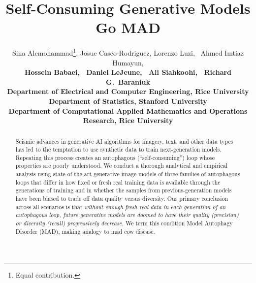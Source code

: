 \documentclass{article}
\title{Self-Consuming Generative Models Go MAD}
\author{
{\small
Sina Alemohammad\thanks{Equal contribution.},\footnotemark[2]{~~}  Josue Casco-Rodriguez\footnotemark[1],\footnotemark[2]{~~}
 Lorenzo Luzi\footnotemark[2],~ Ahmed Imtiaz Humayun\footnotemark[2],} \\
\small \bfseries
Hossein Babaei\footnotemark[2],~ 
Daniel LeJeune\footnotemark[3],~
Ali Siahkoohi\footnotemark[4],~ Richard G.\ Baraniuk\footnotemark[2] \\
  \small {}\footnotemark[2]{~~}Department of Electrical and Computer Engineering, Rice University\\
  \small {}\footnotemark[3]{~~}Department of Statistics, Stanford University\\
  \small {}\footnotemark[4]{~~}Department of Computational Applied Mathematics and Operations Research, Rice University\\
}
\begin{document}
\maketitle

\begin{abstract}
Seismic advances in generative AI algorithms for imagery, text, and other data types has led to the temptation to use synthetic data to train next-generation models.
Repeating this process creates an 
autophagous (``self-consuming'') loop  whose properties are poorly understood.
We conduct a thorough analytical and empirical analysis using state-of-the-art generative image models of three families of autophagous loops that differ in how fixed or fresh real training data is available through the generations of training and in whether the samples from previous-generation models have been biased to trade off data quality versus diversity.  
Our primary conclusion across all scenarios is that {\em without enough fresh real data in each generation of an autophagous loop, future generative models are doomed to have their quality (precision) or diversity (recall) progressively decrease.}
We term this condition Model Autophagy Disorder (MAD), making analogy to mad cow disease.
\end{abstract}
\end{document}
